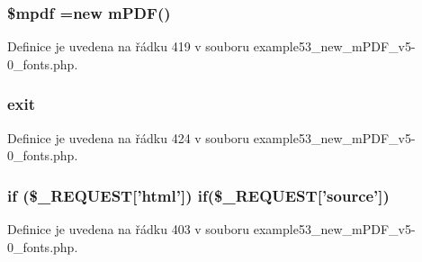 \hypertarget{example53__new__m_p_d_f__v5-0__fonts_8php_ad028f81910d6cbab9b184d2214b3a8f8}{
\subsubsection[{\$mpdf}]{\setlength{\rightskip}{0pt plus 5cm}\$mpdf =new {\bf m\-P\-D\-F}()}}\label{example53__new__m_p_d_f__v5-0__fonts_8php_ad028f81910d6cbab9b184d2214b3a8f8}


Definice je uvedena na řádku 419 v souboru example53\-\_\-new\-\_\-m\-P\-D\-F\-\_\-v5-\/0\-\_\-fonts.\-php.

\hypertarget{example53__new__m_p_d_f__v5-0__fonts_8php_a6733eb5f605d09eaede9845835d71c4e}{
\subsubsection[{exit}]{\setlength{\rightskip}{0pt plus 5cm}exit}}\label{example53__new__m_p_d_f__v5-0__fonts_8php_a6733eb5f605d09eaede9845835d71c4e}


Definice je uvedena na řádku 424 v souboru example53\-\_\-new\-\_\-m\-P\-D\-F\-\_\-v5-\/0\-\_\-fonts.\-php.

\hypertarget{example53__new__m_p_d_f__v5-0__fonts_8php_ae022de9879dfd38cb750eddebfe003fe}{
\subsubsection[{if}]{\setlength{\rightskip}{0pt plus 5cm}if (\$\-\_\-\-R\-E\-Q\-U\-E\-S\-T\mbox{[}'html'\mbox{]}) if(\$\-\_\-\-R\-E\-Q\-U\-E\-S\-T\mbox{[}'source'\mbox{]})}}\label{example53__new__m_p_d_f__v5-0__fonts_8php_ae022de9879dfd38cb750eddebfe003fe}


Definice je uvedena na řádku 403 v souboru example53\-\_\-new\-\_\-m\-P\-D\-F\-\_\-v5-\/0\-\_\-fonts.\-php.

